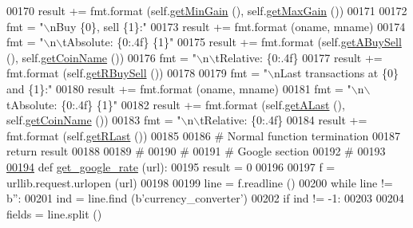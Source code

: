 \begin{DoxyCode}
{00170         result += fmt.format (self.\hyperlink{classexch2exch_1_1_differences_a110cb3a79f744b6d3911b6669b8a0a89}{getMinGain} (), self.\hyperlink{classexch2exch_1_1_differences_a3b557469ba68c3041d6ef04dc847c77b}{getMaxGain} ())
00171         
00172         fmt = \textcolor{stringliteral}{"\(\backslash\)nBuy \{0\}, sell \{1\}:"}
00173         result += fmt.format (oname, mname)
00174         fmt = \textcolor{stringliteral}{"\(\backslash\)n\(\backslash\)tAbsolute: \{0:.4f\} \{1\}"}
00175         result += fmt.format (self.\hyperlink{classexch2exch_1_1_differences_a5b1000fb221e0726fb36a8e9a0655d84}{getABuySell} (), self.\hyperlink{classexch2exch_1_1_differences_a27c3904cedfe6f58d750591c1f7c7879}{getCoinName} ())
00176         fmt = \textcolor{stringliteral}{"\(\backslash\)n\(\backslash\)tRelative: \{0:.4f\} %
00177         result += fmt.format (self.\hyperlink{classexch2exch_1_1_differences_ae360dc9692075e21d0aafa2ff1dc23d4}{getRBuySell} ())
00178         
00179         fmt = \textcolor{stringliteral}{"\(\backslash\)nLast transactions at \{0\} and \{1\}:"}
00180         result += fmt.format (oname, mname)
00181         fmt = \textcolor{stringliteral}{"\(\backslash\)n\(\backslash\)tAbsolute: \{0:.4f\} \{1\}"}
00182         result += fmt.format (self.\hyperlink{classexch2exch_1_1_differences_ae65d1f91ffad5d587a564d7160263b83}{getALast} (), self.\hyperlink{classexch2exch_1_1_differences_a27c3904cedfe6f58d750591c1f7c7879}{getCoinName} ())
00183         fmt = \textcolor{stringliteral}{"\(\backslash\)n\(\backslash\)tRelative: \{0:.4f\} %
00184         result += fmt.format (self.\hyperlink{classexch2exch_1_1_differences_ac4f1f695ff394d65cfb51ea55dc67fa5}{getRLast} ())
00185         
00186         \textcolor{comment}{# Normal function termination}
00187         \textcolor{keywordflow}{return} result
00188 
00189 \textcolor{comment}{#        }
00190 \textcolor{comment}{# }
00191 \textcolor{comment}{# Google section }
00192 \textcolor{comment}{#}
00193 
\hypertarget{exch2exch_8py_source.tex_l00194}{}\hyperlink{namespaceexch2exch_a20ad08d045d52bdcb3977eaa8f951622}{00194} \textcolor{keyword}{def }\hyperlink{namespaceexch2exch_a20ad08d045d52bdcb3977eaa8f951622}{get\_google\_rate} (url):
00195     result = 0
00196 
00197     f = urllib.request.urlopen (url)
00198     
00199     line = f.readline ()
00200     \textcolor{keywordflow}{while} line != b\textcolor{stringliteral}{''}:
00201         ind = line.find (b\textcolor{stringliteral}{'currency\_converter'})
00202         \textcolor{keywordflow}{if} ind != -1:
00203             
00204             fields = line.split ()
}}}
\end{DoxyCode}
